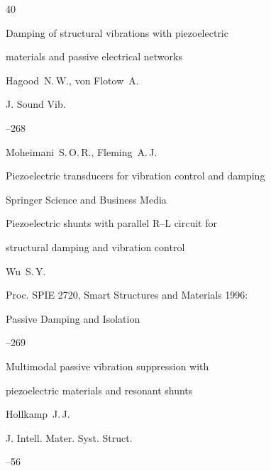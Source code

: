 \begin{thebibliography}{40}




\paper Damping of structural vibrations with piezoelectric

 materials and passive electrical networks

\by Hagood~N.\,W., von Flotow~A.

\jour J. Sound Vib.



--268





\by Moheimani~S.\,O.\,R., Fleming~A.\,J.

\book Piezoelectric transducers for vibration control and damping

\publ Springer Science and Business Media






\paper Piezoelectric shunts with parallel R–L circuit for

structural damping and vibration control

\by Wu~S.\,Y.

\jour Proc. SPIE  2720, Smart Structures and Materials 1996:

Passive Damping and Isolation


--269





\paper Multimodal passive vibration suppression with

piezoelectric materials and resonant shunts

\by Hollkamp~J.\,J.

\jour J. Intell. Mater. Syst. Struct.



--56





\end{thebibliography}
